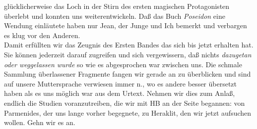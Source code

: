 \documentclass[
]{article}
\begin{document}
glücklicherweise das Loch in der Stirn des ersten magischen
Protagonisten überlebt und konnten uns weiterentwickeln. Daß das Buch
\emph{Poseidon} eine Wendung einläutete haben nur Jean, der Junge und
Ich bemerkt und verbargen es klug vor den Anderen.\\
Damit erfüllten wir das Zeugnis des Ersten Bandes das sich bis jetzt
erhalten hat. Sie können jederzeit darauf zugreifen und sich
vergewissern, daß nichts \emph{dazugetan oder weggelassen wurde} so wie
es abgesprochen war zwischen uns. Die schmale Sammlung überlassener
Fragmente fangen wir gerade an zu überblicken und sind auf unsere
Muttersprache verwiesen immer n., wo es andere besser übersetzt haben
als es uns möglich war aus dem Urtext. Nehmen wir dies zum Anlaß,
endlich die Studien voranzutreiben, die wir mit HB an der Seite
begannen: von Parmenides, der uns lange vorher begegnete, zu Heraklit,
den wir jetzt aufsuchen wollen. Gehn wir es an.
\end{document}
